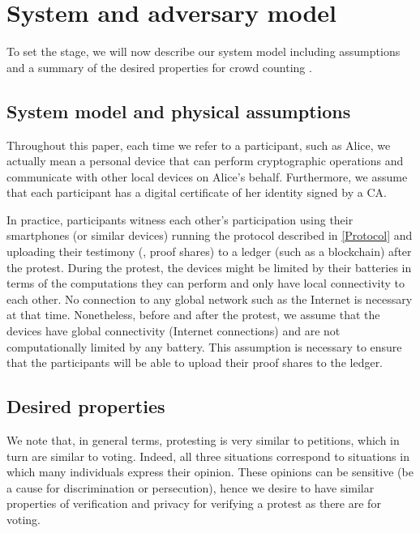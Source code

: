 \section{System and adversary model}%
\label{system-model}

To set the stage, we will now describe our system model including
assumptions and a summary of the desired properties for crowd
counting%
.

\subsection{System model and physical assumptions}%
\label{assumptions}

Throughout this paper, each time we refer to a participant, such as Alice, we actually mean a personal device that can perform cryptographic operations and communicate with other local devices on Alice's behalf. 
Furthermore, we assume that each participant has a digital certificate of her identity signed by a \ac{CA}.

In practice, participants witness each other's participation using their smartphones (or similar devices) running the protocol described in \cref{Protocol} and uploading their testimony (\ie, proof shares) to a ledger (such as a blockchain) after the protest. 
During the protest, the devices might be limited by their batteries in terms of the computations they can perform and only have local connectivity to each other.
No connection to any global network such as the Internet is necessary at that time.  
Nonetheless, before and after the protest, we assume that the devices have global connectivity (\ie Internet connections) and are not computationally limited by any battery.
This assumption is necessary to ensure that the participants will be able to upload their proof shares to the ledger.

\subsection{Desired properties}%
\label{desired-properties}

We note that, in general terms, protesting is very similar to petitions, which 
in turn are similar to voting.
Indeed, all three situations correspond to situations in which many individuals express their opinion.
These opinions can be sensitive (\eg be a cause for discrimination or persecution), hence we desire to have similar properties of verification and privacy for verifying a protest as there are for voting.

